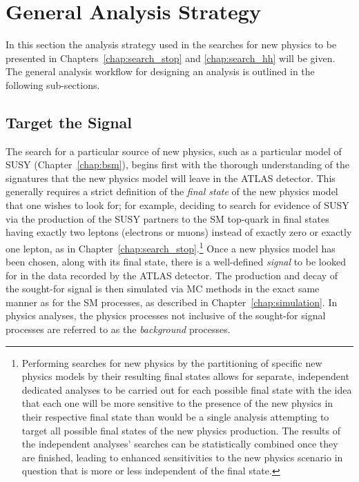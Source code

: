 \section{General Analysis Strategy}
\label{sec:gen_strategy}

In this section the analysis strategy used in the searches for new physics
to be presented in Chapters~\ref{chap:search_stop} and \ref{chap:search_hh}
will be given.
The general analysis workflow for designing an analysis is outlined in the following
sub-sections.

\subsection{Target the Signal}
\label{sec:sig_pheno}

The search for a particular source of new physics, such as a particular model of SUSY (Chapter~\ref{chap:bsm}),
begins first with the thorough understanding of the signatures that the new physics model
will leave in the ATLAS detector.
This generally requires a strict definition of the \textit{final state} of the
new physics model that one wishes to look for; for example, deciding to search for
evidence of SUSY via the production of the SUSY partners to the SM top-quark
in final states having exactly two leptons (electrons or muons) instead of
exactly zero or exactly one lepton, as in Chapter~\ref{chap:search_stop}.\footnote{Performing
searches for new physics by the partitioning of specific new physics models
by their resulting final states allows for separate, independent dedicated analyses to be carried out
for each possible final state with the idea that each one will be more sensitive
to the presence of the new physics in their respective final state than would be
a single analysis attempting to target all possible final states of the new physics production.
The results of the independent analyses' searches can be statistically combined once they are finished,
leading to enhanced sensitivities to the new physics scenario in question that is more or less independent
of the final state.}
Once a new physics model has been chosen, along with its final state, there is a well-defined
\textit{signal} to be looked for in the data recorded by the ATLAS detector.
The production and decay of the sought-for signal is then simulated via MC methods in the exact
same manner as for the SM processes, as described in Chapter~\ref{chap:simulation}.
In physics analyses, the physics processes not inclusive of the sought-for signal processes
are referred to as the \textit{background} processes.

